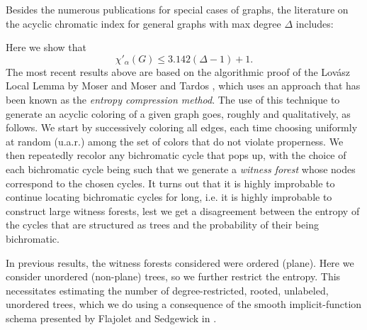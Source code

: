 \documentclass{amsart}
\theoremstyle{plain}
\begin{document}
 Besides the numerous publications for special cases of graphs, the  literature  on the acyclic chromatic index for general graphs with max degree $\Delta$  includes:  
  Here we show that $$\chi'_{\alpha}(G) \leq 3.142(\Delta-1) +1.$$
 The most recent results above are based on the algorithmic proof of the
Lov\'{a}sz Local Lemma by Moser \cite{moser2009constructive} and
Moser and Tardos \cite{moser2010constructive}, which uses an approach that has
been known as the {\em entropy compression method}. The use of this technique
to generate an acyclic coloring of a given graph goes, roughly and
qualitatively, as follows. We start by successively coloring all edges, each
time choosing uniformly at random (u.a.r.) among the set of colors that do not
violate properness. We then repeatedly recolor any bichromatic cycle that pops
up, with the choice of each bichromatic cycle being such that we generate a
{\em witness forest} whose nodes correspond to the chosen cycles. It turns out that it is
highly improbable to continue locating bichromatic cycles for long, i.e. it is
highly improbable to construct large witness forests, lest we get a
disagreement between the entropy of the  cycles that are structured as trees and the probability
of their being bichromatic.   
 
 

 In previous results, the witness forests considered were ordered (plane).
Here we consider unordered (non-plane) trees, so we further restrict the
entropy. This necessitates estimating the number of degree-restricted, rooted,
unlabeled, unordered trees, which we do using a consequence of the smooth implicit-function schema presented by Flajolet and Sedgewick in \cite[Theorem VII.3, p. 268]{Flajolet:2009:AC:1506267}. 
\end{document}
